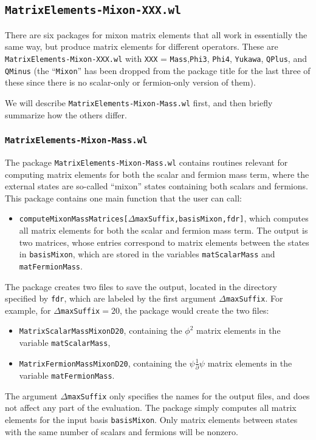 \documentclass[12pt]{article}
\newcommand\De\Delta
\newcommand{\p}{\partial}
\newcommand{\fr}{\frac}
\begin{document}
\subsection{{\tt MatrixElements-Mixon-XXX.wl}}

There are six packages for mixon matrix elements that all work in essentially the same way, but produce matrix elements for different operators.  These are {\tt MatrixElements-Mixon-XXX.wl} with {\tt XXX} = {\tt Mass},{\tt Phi3}, {\tt Phi4}, {\tt Yukawa}, {\tt QPlus}, and {\tt QMinus} (the ``{\tt Mixon}'' has been dropped from the package title for the last three of these since there is no scalar-only or fermion-only version of them).

We will describe {\tt MatrixElements-Mixon-Mass.wl} first, and then briefly summarize how the others differ.


\subsubsection*{{\tt MatrixElements-Mixon-Mass.wl}}

The package {\tt MatrixElements-Mixon-Mass.wl} contains routines relevant for computing matrix elements for both the scalar and fermion mass term, where the external states are so-called ``mixon'' states containing both scalars and fermions. This package contains one main function that the user can call:
\begin{itemize}
\item {\tt computeMixonMassMatrices[$\De$maxSuffix,basisMixon,fdr]}, which computes all matrix elements for both the scalar and fermion mass term. The output is two matrices, whose entries correspond to matrix elements between the states in {\tt basisMixon}, which are stored in the variables {\tt matScalarMass} and {\tt matFermionMass}.
\end{itemize}
The package creates two files to save the output, located in the directory specified by {\tt fdr}, which are labeled by the first argument {\tt $\De$maxSuffix}. For example, for {\tt $\De$maxSuffix$=20$}, the package would create the two files:
\begin{itemize}
\item {\tt MatrixScalarMassMixonD20}, containing the $\phi^2$ matrix elements in the variable {\tt matScalarMass},
\item {\tt MatrixFermionMassMixonD20}, containing the $\psi\fr{1}{\p}\psi$ matrix elements in the variable {\tt matFermionMass}.
\end{itemize}
The argument {\tt $\De$maxSuffix} only specifies the names for the output files, and does not affect any part of the evaluation. The package simply computes all matrix elements for the input basis {\tt basisMixon}. Only matrix elements between states with the same number of scalars and fermions will be nonzero.
\end{document}
